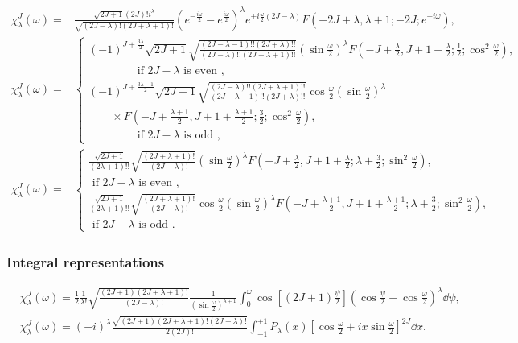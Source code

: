\begin{align}
\chi_{\lambda}^{J}(\omega)= & \frac{\sqrt{2 J+1}(2 J)!i^{\lambda}}{\sqrt{(2 J-\lambda)!(2 J+\lambda+1)!}}\left(e^{-\frac{i \omega}{2}}-e^{\frac{i \omega}{2}}\right)^{\lambda} e^{ \pm i \frac{\omega}{2}(2 J-\lambda)} F\left(-2 J+\lambda, \lambda+1 ;-2 J ; e^{\mp i \omega}\right) , \label{eq:4:15:14}\\
\chi_{\lambda}^{J}(\omega)= & \left\{\begin{array}{l}
(-1)^{J+\frac{3 \lambda}{2}} \sqrt{2 J+1} \sqrt{\frac{(2 J-\lambda-1)!!(2 J+\lambda)!!}{(2 J-\lambda)!!(2 J+\lambda+1)!!}}\left(\sin \frac{\omega}{2}\right)^{\lambda} F\left(-J+\frac{\lambda}{2}, J+1+\frac{\lambda}{2} ; \frac{1}{2} ; \cos ^{2} \frac{\omega}{2}\right), \\
\qquad\qquad \text { if } 2 J-\lambda \text { is even } ,\\
(-1)^{J+\frac{3 \lambda-1}{2}} \sqrt{2 J+1} \sqrt{\frac{(2 J-\lambda)!!(2 J+\lambda+1)!!}{(2 J-\lambda-1)!!(2 J+\lambda)!!}} \cos \frac{\omega}{2}\left(\sin \frac{\omega}{2}\right)^{\lambda} \\
\qquad\times F\left(-J+\frac{\lambda+1}{2}, J+1+\frac{\lambda+1}{2} ; \frac{3}{2} ; \cos ^{2} \frac{\omega}{2}\right), \\
\qquad\qquad\text { if } 2 J-\lambda \text { is odd },
\end{array}\right.  \label{eq:4:15:15}\\
\chi_{\lambda}^{J}(\omega)= & \left\{\begin{array}{c}
\frac{\sqrt{2 J+1}}{(2 \lambda+1)!!} \sqrt{\frac{(2 J+\lambda+1)!}{(2 J-\lambda)!}}\left(\sin \frac{\omega}{2}\right)^{\lambda} F\left(-J+\frac{\lambda}{2}, J+1+\frac{\lambda}{2} ; \lambda+\frac{3}{2} ; \sin ^{2} \frac{\omega}{2}\right) ,\\
\text { if } 2 J-\lambda \text { is even }, \\
\frac{\sqrt{2 J+1}}{(2 \lambda+1)!!} \sqrt{\frac{(2 J+\lambda+1)!}{(2 J-\lambda)!}} \cos \frac{\omega}{2}\left(\sin \frac{\omega}{2}\right)^{\lambda} F\left(-J+\frac{\lambda+1}{2}, J+1+\frac{\lambda+1}{2} ; \lambda+\frac{3}{2} ; \sin ^{2} \frac{\omega}{2}\right), \\
\text { if } 2 J-\lambda \text { is odd }.
\end{array}\right. \label{eq:4:15:16}
\end{align}
\subsubsection{Integral representations}
\begin{align}
& \chi_{\lambda}^{J}(\omega)=\frac{1}{2} \frac{1}{\lambda!} \sqrt{\frac{(2 J+1)(2 J+\lambda+1)!}{(2 J-\lambda)!}} \frac{1}{\left(\sin \frac{\omega}{2}\right)^{\lambda+1}} \int_{0}^{\omega} \cos \left[(2 J+1) \frac{\psi}{2}\right]\left(\cos \frac{\psi}{2}-\cos \frac{\omega}{2}\right)^{\lambda} \dd \psi , \label{eq:4:15:17}\\
& \chi_{\lambda}^{J}(\omega)=(-i)^{\lambda} \frac{\sqrt{(2 J+1)(2 J+\lambda+1)!(2 J-\lambda)!}}{2(2 J)!} \int_{-1}^{+1} P_{\lambda}(x)\left[\cos \frac{\omega}{2}+i x \sin \frac{\omega}{2}\right]^{2 J} \dd x .\label{eq:4:15:18}
\end{align}
